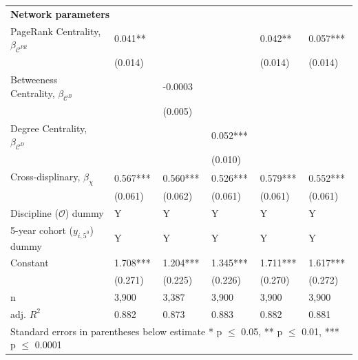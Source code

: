 \documentclass[10pt]{article}          %
\begin{document}
\begin{table}[H]
\begin{tabular}{m{5cm} p{2.1cm} p{2.1cm} p{2.1cm} p{2.1cm} p{2.1cm} }
\multicolumn{6}{l}{\textbf{Network parameters}} \\
\rowcolor{lightgray}
{PageRank Centrality, $\beta_{\mathscr{C}^{PR}}$}     & 0.041** &  &              & 0.042**   & 0.057***  \\ 
                                              & (0.014) &  &              & (0.014)   & (0.014)   \\
\rowcolor{lightgray}
{Betweeness Centrality, $\beta_{\mathscr{C}^B}$}    &  & -0.0003 &  &  &  \\ 
                                              &  & (0.005) & & & \\
\rowcolor{lightgray}
{Degree Centrality, $\beta_{\mathscr{C}^D}$}        &  &  & 0.052*** & & \\ 
                                              &  &  & (0.010) & & \\
\rowcolor{lightgray}
{Cross-displinary, $\beta_{\chi}$}          & 0.567***  & 0.560***  & 0.526***  & 0.579***  & 0.552***  \\
                                            & (0.061)   & (0.062)   & (0.061)   & (0.061)   & (0.061) \\ \hline

\rowcolor{lightgray}
{Discipline ($\mathscr{O}$) dummy}                & Y & Y & Y & Y & Y  \\
\rowcolor{lightgray}
{5-year cohort ($y_{i,5^0}$) dummy}   & Y & Y & Y & Y & Y \\
\rowcolor{lightgray}
{Constant}                            & 1.708***  & 1.204***  & 1.345***  & 1.711***  & 1.617***  \\ 
                                      & (0.271)   & (0.225)   & (0.226)   & (0.270)   & (0.272)   \\ \hline

\rowcolor{lightgray}
{n}                                   & 3,900 & 3,387 & 3,900 & 3,900 & 3,900 \\
\rowcolor{lightgray}
{adj. $R^2$}                          & 0.882 & 0.873 & 0.883 & 0.882 & 0.881 \\ \hline \hline
\multicolumn{6}{l}{\footnotesize{Standard errors in parentheses below estimate * p $\leq$ 0.05, ** p $\leq$ 0.01, *** p $\leq$ 0.0001}}

\end{tabular}
\label{tbl:sT3}
\end{table}

\newpage
\end{document}
